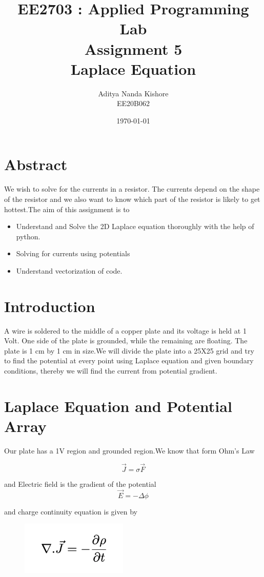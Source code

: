 \documentclass[12pt, a4paper]{report}
\title{\textbf{EE2703 : Applied Programming Lab \\ Assignment 5 \\ Laplace Equation}}
\author{Aditya Nanda Kishore\\ EE20B062}
\date{\today} %
\begin{document}
		
\maketitle
\section*{Abstract}
We wish to solve for the currents in a resistor. The currents depend on the shape of the resistor and we also want to know which part of the resistor is likely to get hottest.The aim of this assignment is to 
\begin{itemize}
	\item Understand and Solve the 2D Laplace equation thoroughly with the help of python.
	\item Solving for currents using potentials
	\item Understand vectorization of code.
\end{itemize}

\section*{Introduction}
A wire is soldered to the middle of a copper plate and its voltage is held at 1 Volt. One side of the plate is grounded, while the remaining are floating. The plate is 1 cm by 1 cm in size.We will divide the plate into a 25X25 grid and try to find the potential at every point using Laplace equation and given boundary conditions, thereby we will find the current from potential gradient. 

\section*{Laplace Equation and Potential Array}
Our plate has a 1V region and grounded region.We know that form Ohm's Law

\begin{equation}
  \vec{J} = \sigma\vec{F}
\end{equation}

and Electric field is the gradient of the potential
\begin{equation}
  \vec{E} = -\Delta\phi
\end{equation}

and charge continuity equation is given by 
\begin{figure}[!tbh]
   	\centering
   	\includegraphics[scale=0.85]{A.png}
 \end{figure} 
 
\end{document}
